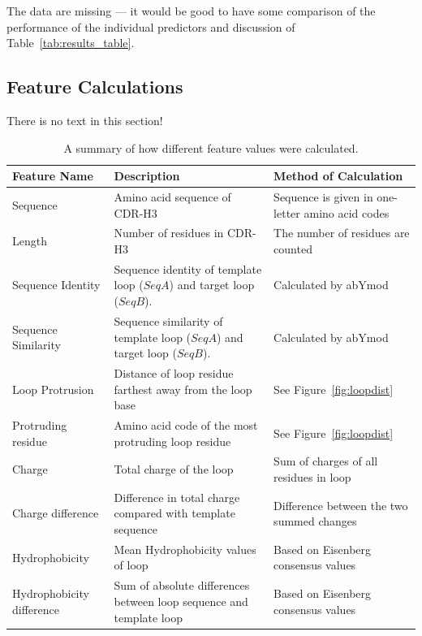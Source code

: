 \documentclass[12pt]{article}
\newcommand{\lilian}[1]{ {\color{red}{\bfseries Lilian:} #1}}
\begin{document}
\lilian{The data are missing --- it would be good to have some
  comparison of the performance of the individual predictors and
  discussion of Table~\ref{tab:results_table}.}

\subsection{Feature Calculations}

\lilian{There is no text in this section!}

\begin{landscape}
\begin{longtable}{p{3cm}p{10cm}p{10cm}}
  \caption{A summary of how different feature values were calculated.}
  \label{tab:feature_table}\\ \hline
%
  \mbox{Feature} \mbox{Name}  %
  & Description %
  & Method of Calculation\\ \hline
%  
  Sequence %
  & Amino acid sequence of CDR-H3 %
  & Sequence is given in one-letter amino acid codes\\
%  
  Length %
  & Number of residues in CDR-H3 %
  & The number of residues are counted\\
%  
  \mbox{Sequence} \mbox{Identity} %
  & Sequence identity of template loop ($SeqA$) and target loop ($SeqB$). %
  & Calculated by abYmod\\
%  
  \mbox{Sequence} \mbox{Similarity} %
  & Sequence similarity of template loop ($SeqA$) and target loop ($SeqB$). %
  & Calculated by abYmod\\
%  
  \mbox{Loop} \mbox{Protrusion} %
  & Distance of loop residue farthest away from the loop base %
  & See Figure~\protect\ref{fig:loopdist}\\
%  
  \mbox{Protruding} \mbox{residue} %
  & Amino acid code of the most protruding loop residue %
  & See Figure~\protect\ref{fig:loopdist}\\
%  
  Charge %
  & Total charge of the loop %
  & Sum of charges of all residues in loop\\
%  
  \mbox{Charge} \mbox{difference} %
  & Difference in total charge compared with template sequence %
  & Difference between the two summed changes\\
%  
  Hydrophobicity %
  & Mean Hydrophobicity values of loop %
  & Based on Eisenberg consensus values\\
%  
  \mbox{Hydrophobicity} \mbox{difference} %
  & Sum of absolute differences between loop sequence and template loop %
  & Based on Eisenberg consensus values\\

\end{longtable}
\end{landscape}
\end{document}
